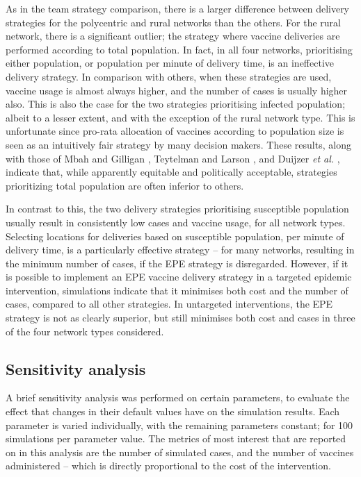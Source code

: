 \documentclass[10pt,letterpaper]{article}
\begin{document}
As in the team strategy comparison, there is a larger difference between delivery strategies for the polycentric and rural networks than the others. For the rural network, there is a significant outlier; the strategy where vaccine deliveries are performed according to total population. In fact, in all four networks, prioritising either population, or population per minute of delivery time, is an ineffective delivery strategy. In comparison with others, when these strategies are used, vaccine usage is almost always higher, and the number of cases is usually higher also. This is also the case for the two strategies prioritising infected population; albeit to a lesser extent, and with the exception of the rural network type. This is unfortunate since pro-rata allocation of vaccines according to population size is seen as an intuitively fair strategy by many decision makers. These results, along with those of Mbah and Gilligan \cite{mbah2011resource}, Teytelman and Larson \cite{teytelman2013multiregional}, and Duijzer \textit{et al.} \cite{duijzer2018dose}, indicate that, while apparently equitable and politically acceptable, strategies prioritizing total population are often inferior to others.

In contrast to this, the two delivery strategies prioritising susceptible population usually result in consistently low cases and vaccine usage, for all network types. Selecting locations for deliveries based on susceptible population, per minute of delivery time, is a particularly effective strategy -- for many networks, resulting in the minimum number of cases, if the EPE strategy is disregarded. However, if it is possible to implement an EPE vaccine delivery strategy in a targeted epidemic intervention, simulations indicate that it minimises both cost and the number of cases, compared to all other strategies. In untargeted interventions, the EPE strategy is not as clearly superior, but still minimises both cost and cases in three of the four network types considered.

\subsection*{Sensitivity analysis}
A brief sensitivity analysis was performed on certain parameters, to evaluate the effect that changes in their default values have on the simulation results. Each parameter is varied individually, with the remaining parameters constant; for 100 simulations per parameter value. The metrics of most interest that are reported on in this analysis are the number of simulated cases, and the number of vaccines administered -- which is directly proportional to the cost of the intervention.
\end{document}
